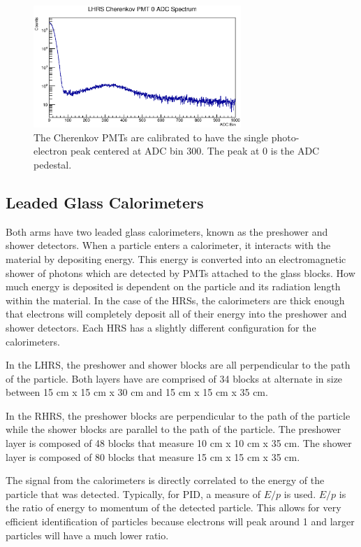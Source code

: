 \begin{figure}
\begin{center}
	\includegraphics[width=0.7\textwidth]{./setup/fig/cer_pmt.eps}
	\caption{The Cherenkov PMTs are calibrated to have the single photo-electron peak centered at ADC bin 300. The peak at 0 is the ADC pedestal.}
	\label{fig:cer_pmt}
\end{center}
\end{figure}

\subsection{Leaded Glass Calorimeters}

Both arms have two leaded glass calorimeters, known as the preshower and shower detectors. When a particle enters a calorimeter, it interacts with the material by depositing energy. This energy is converted into an electromagnetic shower of photons which are detected by PMTs attached to the glass blocks. How much energy is deposited is dependent on the particle and its radiation length within the material. In the case of the HRSs, the calorimeters are thick enough that electrons will completely deposit all of their energy into the preshower and shower detectors. Each HRS has a slightly different configuration for the calorimeters.

In the LHRS, the preshower and shower blocks are all perpendicular to the path of the particle. Both layers have are comprised of 34 blocks at alternate in size between 15 cm x 15 cm x 30 cm and 15 cm x 15 cm x 35 cm.

In the RHRS, the preshower blocks are perpendicular to the path of the particle while the shower blocks are parallel to the path of the particle. The preshower layer is composed of 48 blocks that measure 10 cm x 10 cm x 35 cm. The shower layer is composed of 80 blocks that measure 15 cm x 15 cm x 35 cm.

The signal from the calorimeters is directly correlated to the energy of the particle that was detected. Typically, for PID, a measure of $E/p$ is used. $E/p$ is the ratio of energy to momentum of the detected particle. This allows for very efficient identification of particles because electrons will peak around 1 and larger particles will have a much lower ratio.

